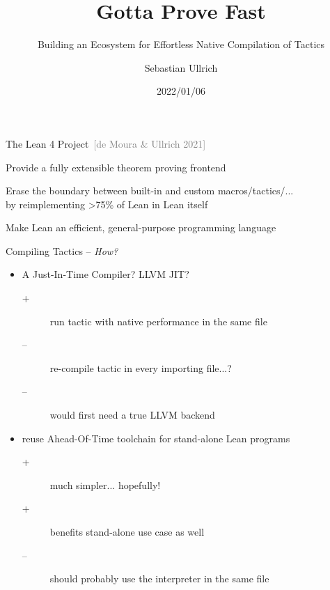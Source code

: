 \documentclass[en,t,navbarkit]{sdqbeamer}
\title{Gotta Prove Fast}
\subtitle{Building an Ecosystem for Effortless Native Compilation of Tactics}
\author{Sebastian Ullrich}
\date{2022/01/06}
\begin{document}
\KITtitleframe

\begin{frame}{The Lean 4 Project~\textcolor{gray}{\small[de Moura \& Ullrich 2021]\nocite{demoura2021lean}}}
  \begin{centering}
    \vfill

  Provide a fully extensible theorem proving frontend

  \vfill

  Erase the boundary between built-in and custom macros/tactics/...
  \\
  by reimplementing >75\% of Lean in Lean itself

  \vfill

  Make Lean an efficient, general-purpose programming language

  \vfill
  \end{centering}
\end{frame}


\begin{frame}{Compiling Tactics -- \emph{How?}}
  \pause
  \begin{itemize}
    \item A Just-In-Time Compiler? LLVM JIT?
          \begin{description}
            \item[+] run tactic with native performance in the same file
            \item[--] re-compile tactic in every importing file...?
            \item[--] would first need a true LLVM backend
          \end{description}
          \pause
    \item reuse Ahead-Of-Time toolchain for stand-alone Lean programs
          \begin{description}
            \item[+] much simpler... hopefully!
            \item[+] benefits stand-alone use case as well
            \item[--] should probably use the interpreter in the same file
          \end{description}
  \end{itemize}
\end{frame}
\end{document}
